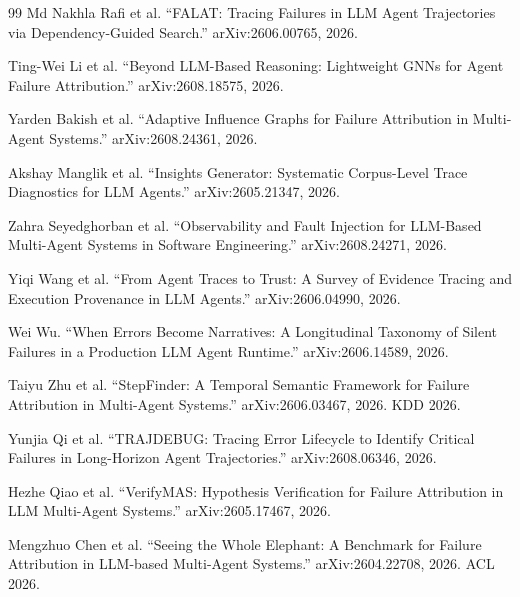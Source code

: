 \begin{thebibliography}{99}
Md Nakhla Rafi et al.
``FALAT: Tracing Failures in LLM Agent Trajectories via Dependency-Guided Search.''
arXiv:2606.00765, 2026.

Ting-Wei Li et al.
``Beyond LLM-Based Reasoning: Lightweight GNNs for Agent Failure Attribution.''
arXiv:2608.18575, 2026.

Yarden Bakish et al.
``Adaptive Influence Graphs for Failure Attribution in Multi-Agent Systems.''
arXiv:2608.24361, 2026.

Akshay Manglik et al.
``Insights Generator: Systematic Corpus-Level Trace Diagnostics for LLM Agents.''
arXiv:2605.21347, 2026.

Zahra Seyedghorban et al.
``Observability and Fault Injection for LLM-Based Multi-Agent Systems in Software Engineering.''
arXiv:2608.24271, 2026.

Yiqi Wang et al.
``From Agent Traces to Trust: A Survey of Evidence Tracing and Execution Provenance in LLM Agents.''
arXiv:2606.04990, 2026.

Wei Wu.
``When Errors Become Narratives: A Longitudinal Taxonomy of Silent Failures in a Production LLM Agent Runtime.''
arXiv:2606.14589, 2026.

Taiyu Zhu et al.
``StepFinder: A Temporal Semantic Framework for Failure Attribution in Multi-Agent Systems.''
arXiv:2606.03467, 2026. KDD 2026.

Yunjia Qi et al.
``TRAJDEBUG: Tracing Error Lifecycle to Identify Critical Failures in Long-Horizon Agent Trajectories.''
arXiv:2608.06346, 2026.

Hezhe Qiao et al.
``VerifyMAS: Hypothesis Verification for Failure Attribution in LLM Multi-Agent Systems.''
arXiv:2605.17467, 2026.

Mengzhuo Chen et al.
``Seeing the Whole Elephant: A Benchmark for Failure Attribution in LLM-based Multi-Agent Systems.''
arXiv:2604.22708, 2026. ACL 2026.
\end{thebibliography}


